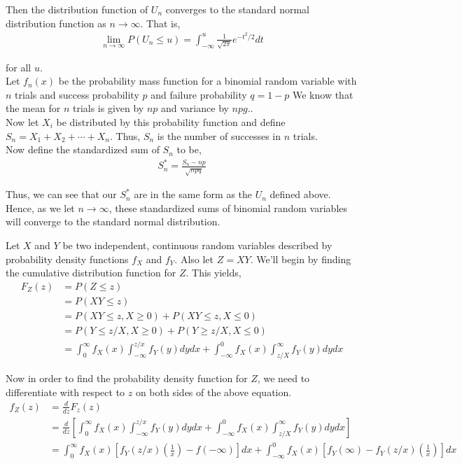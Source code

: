 \documentclass[12pt]{article}
\newenvironment{problem}[2][Problem]{\begin{trivlist}
\item[\hskip \labelsep {\bfseries #1}\hskip \labelsep {\bfseries #2.}]}{\end{trivlist}}
\begin{document}
\noindent Then the distribution function of $U_n$ converges to the standard normal distribution function as $n \to \infty$. That is,
\begin{align*}
\lim_{n \to \infty} P(U_n \leq u) = \int_{-\infty}^{u} \frac{1}{\sqrt{2\pi}}e^{-t^2/2}dt
\end{align*}

\noindent for all $u$.\\

\noindent Let $f_n(x)$ be the probability mass function for a binomial random variable with $n$ trials and success probability $p$ and failure probability $q = 1-p$ We know that the mean for $n$ trials is given by $np$ and variance by $npg$..\\

Now let $X_i$ be distributed by this probability function and define $S_n = X_1 + X_2 + \cdots + X_n$. Thus, $S_n$ is the number of successes in  $n$ trials.\\

Now define the standardized sum of $S_n$ to be,
\begin{align*}
S_n^* = \frac{S_n - np}{\sqrt{npq}}
\end{align*}

Thus, we can see that our $S_n^*$ are in the same form as the $U_n$ defined above. Hence, as we let $n \to \infty$, these standardized sums of binomial random variables will converge to the standard normal distribution.
\newpage
\begin{problem}{8}
\end{problem}

Let $X$ and $Y$ be two independent, continuous random variables described by probability density functions $f_X$ and $f_Y$. Also let $Z = XY$. We'll begin by finding the cumulative distribution function for $Z$. This yields,
\begin{align*}
F_Z(z) &= P(Z \leq z)\\
&= P(XY \leq z)\\
&= P(XY \leq z, X \geq 0) + P(XY \leq z, X \leq 0)\\
&= P(Y \leq z/X, X \geq 0) + P(Y \geq z/X, X \leq 0)\\
&= \int_{0}^{\infty} f_X(x) \int_{-\infty}^{z/x} f_Y(y) dy dx + \int_{-\infty}^0 f_X(x) \int_{z/X}^{\infty} f_Y(y) dy dx
\end{align*}

Now in order to find the probability density function for $Z$, we need to differentiate with respect to $z$ on both sides of the above equation.
\begin{align*}
f_Z(z) &= \frac{d}{dz}F_z(z)\\
&= \frac{d}{dz}\left[\int_{0}^{\infty} f_X(x) \int_{-\infty}^{z/x} f_Y(y) dy dx + \int_{-\infty}^0 f_X(x) \int_{z/X}^{\infty} f_Y(y) dy dx\right]\\
&= \int_{0}^{\infty} f_X(x) \left[f_Y(z/x)\left(\frac{1}{x}\right) - f(-\infty)\right] dx + \int_{-\infty}^{0} f_X(x) \left[f_Y(\infty) - f_Y(z/x)\left(\frac{1}{x}\right)\right] dx
\end{align*}
\end{document}
